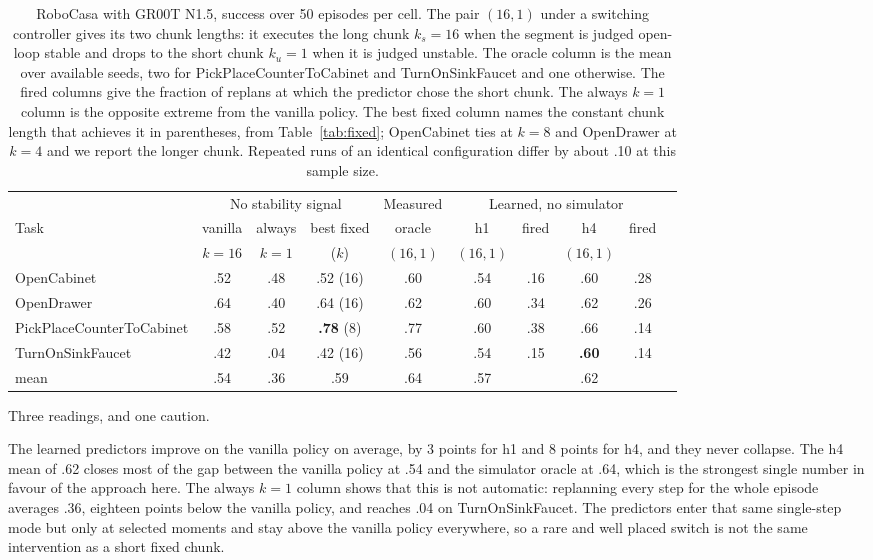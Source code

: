 \begin{table}[t]
\centering
\footnotesize
\setlength{\tabcolsep}{4.5pt}
\begin{tabular}{lccccccccc}
\toprule
& \multicolumn{3}{c}{No stability signal} & \multicolumn{1}{c}{Measured} & \multicolumn{4}{c}{Learned, no simulator} \\
\cmidrule(lr){2-4} \cmidrule(lr){5-5} \cmidrule(lr){6-9}
Task & vanilla & always & best fixed & oracle & h1 & fired & h4 & fired \\
& $k{=}16$ & $k{=}1$ & ($k$) & $(16,1)$ & $(16,1)$ & & $(16,1)$ & \\
\midrule
OpenCabinet & .52 & .48 & .52 (16) & .60 & .54 & .16 & .60 & .28 \\
OpenDrawer & .64 & .40 & .64 (16) & .62 & .60 & .34 & .62 & .26 \\
PickPlaceCounterToCabinet & .58 & .52 & \textbf{.78} (8) & .77 & .60 & .38 & .66 & .14 \\
TurnOnSinkFaucet & .42 & .04 & .42 (16) & .56 & .54 & .15 & \textbf{.60} & .14 \\
\midrule
mean & .54 & .36 & .59 & .64 & .57 & & .62 & \\
\bottomrule
\end{tabular}
\caption{RoboCasa with GR00T N1.5, success over 50 episodes per cell. The pair
$(16,1)$ under a switching controller gives its two chunk lengths: it executes
the long chunk $k_s{=}16$ when the segment is judged open-loop stable and drops
to the short chunk $k_u{=}1$ when it is judged unstable. The oracle column is
the mean over available seeds, two for PickPlaceCounterToCabinet and
TurnOnSinkFaucet and one otherwise. The fired columns give the fraction of
replans at which the predictor chose the short chunk. The always $k{=}1$ column
is the opposite extreme from the vanilla policy. The best fixed column names
the constant chunk length that achieves it in parentheses, from
Table~\ref{tab:fixed}; OpenCabinet ties at $k{=}8$ and OpenDrawer at $k{=}4$
and we report the longer chunk. Repeated runs of an identical configuration
differ by about .10 at this sample size.}
\label{tab:main}
\end{table}

Three readings, and one caution.

The learned predictors improve on the vanilla policy on average, by 3 points
for h1 and 8 points for h4, and they never collapse. The h4 mean of .62 closes
most of the gap between the vanilla policy at .54 and the simulator oracle at
.64, which is the strongest single number in favour of the approach here. The always $k{=}1$ column
shows that this is not automatic: replanning every step for the whole episode
averages .36, eighteen points below the vanilla policy, and reaches .04 on
TurnOnSinkFaucet. The predictors enter that same single-step mode but only at
selected moments and stay above the vanilla policy everywhere, so a rare and
well placed switch is not the same intervention as a short fixed chunk.

